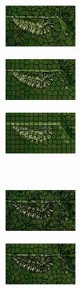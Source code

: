 \begin{figure}
	\centering
	\begin{subfigure}[b]{0.02\textwidth}
	\end{subfigure}
	\begin{subfigure}[b]{0.141\textwidth}
		\includegraphics[height=1.525cm]{pictures/compactness/bsds500/slic/score/1/cropped/slic_35028_contours}
	\end{subfigure}
	\begin{subfigure}[b]{0.141\textwidth}
		\includegraphics[height=1.525cm]{pictures/compactness/bsds500/slic/score/10/cropped/slic_35028_contours}
	\end{subfigure}
	\begin{subfigure}[b]{0.141\textwidth}
		\includegraphics[height=1.525cm]{pictures/compactness/bsds500/slic/score/80/cropped/slic_35028_contours}
	\end{subfigure}\\
	\begin{subfigure}[b]{0.02\textwidth}
	\end{subfigure}
	\begin{subfigure}[b]{0.141\textwidth}
		\includegraphics[height=1.525cm]{pictures/compactness/bsds500/vlslic/score/1/cropped/vlslic_35028_contours}
	\end{subfigure}
	\begin{subfigure}[b]{0.141\textwidth}
		\includegraphics[height=1.525cm]{pictures/compactness/bsds500/vlslic/score/10/cropped/vlslic_35028_contours}

\end{subfigure}
\end{figure}
